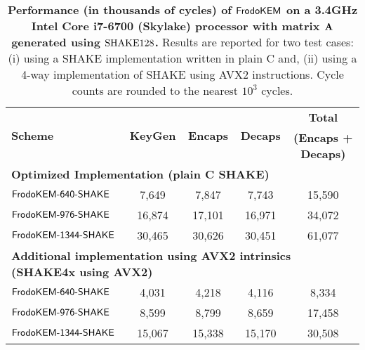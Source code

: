 \documentclass{iacrcc}
\begin{document}
\begin{table}[t]
\caption{\textbf{Performance (in thousands of cycles) of $\textsf{\upshape\mdseries FrodoKEM}$ on a 3.4GHz Intel Core i7-6700 (Skylake) processor with matrix $\mathbf{A}$ generated using $\textrm{\upshape\mdseries SHAKE}128$.} Results are reported for two test cases: (i) using a SHAKE implementation written in plain C and, (ii) using a 4-way implementation of SHAKE using AVX2 instructions. Cycle counts are rounded to the nearest $10^3$ cycles.}\label{tab:results_x64_shake}
\medskip
\centering
\renewcommand{\tabcolsep}{0.4cm}
\renewcommand{\arraystretch}{1.1}
\begin{tabular}{l|c c c|c}
\toprule
\multirow{2}{*}{\textbf{Scheme}} & \multirow{2}{*}{\textbf{KeyGen}} & \multirow{2}{*}{\textbf{Encaps}} & \multirow{2}{*}{\textbf{Decaps}} & \textbf{Total}             \\ 
                                 &                                  &                                  &                                  & \textbf{(Encaps + Decaps)} \\ 
\midrule
\multicolumn{5}{l}{\bf Optimized Implementation (plain C SHAKE)} \\
\midrule
$\textsf{\upshape\mdseries FrodoKEM-640-SHAKE}$            &           7,649                  &           7,847                  &                7,743             &              15,590        \\
$\textsf{\upshape\mdseries FrodoKEM-976-SHAKE}$          &          16,874                  &          17,101                  &               16,971           &              34,072        \\
$\textsf{\upshape\mdseries FrodoKEM-1344-SHAKE}$          &          30,465                  &          30,626                  &               30,451             &              61,077        \\
\midrule
\multicolumn{5}{l}{\bf Additional implementation using AVX2 intrinsics (SHAKE4x using AVX2)} \\
\midrule
$\textsf{\upshape\mdseries FrodoKEM-640-SHAKE}$            &           4,031                  &           4,218                  &                4,116             &               8,334        \\
$\textsf{\upshape\mdseries FrodoKEM-976-SHAKE}$          &           8,599                  &           8,799                  &                8,659             &              17,458        \\
$\textsf{\upshape\mdseries FrodoKEM-1344-SHAKE}$          &          15,067                  &          15,338                  &               15,170             &              30,508        \\
\bottomrule
\end{tabular}
\end{table}
\fi
\end{document}
